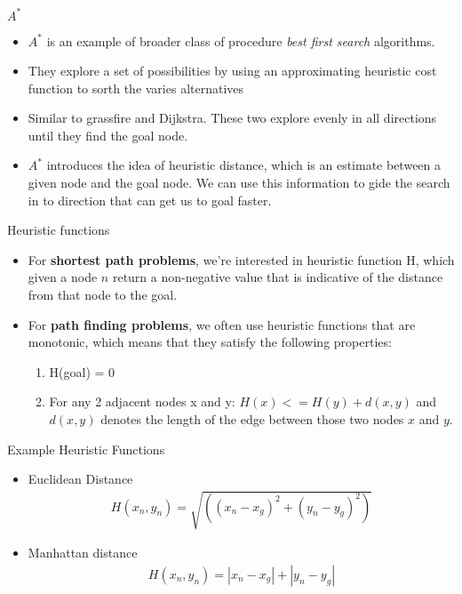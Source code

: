 \documentclass[10pt,mathserif]{beamer}
\begin{document}
\begin{frame}{$A^*$}
\begin{itemize}
\item $A^*$ is an example of broader class of procedure \textit{best first search} algorithms.
\item They explore a set of possibilities by using an approximating heuristic cost function to sorth the varies alternatives
\item Similar to grassfire and Dijkstra. These two explore evenly in all directions until they find the goal node.
\item $A^*$ introduces the idea of heuristic distance, which is an estimate between a given node and the goal node. We can use this information to gide the search in to direction that can get us to goal faster.
\end{itemize}
\end{frame}

\begin{frame}{Heuristic functions}
\begin{itemize}
\item For \textbf{shortest path problems}, we're interested in heuristic function H, which given a 
node $n$ return a non-negative value that is indicative of the distance from that node to the goal.
\item For \textbf{path finding problems}, we often use heuristic functions that are monotonic, which means that they satisfy the following properties:
\begin{enumerate}
\item H(goal) = 0
\item For any 2 adjacent nodes x and y: $H(x) <= H(y) + d(x,y)$ and $d(x,y)$ denotes the length of the edge between those two nodes $x$ and $y$.
\end{enumerate}
\end{itemize}
\end{frame}

\begin{frame}{Example Heuristic Functions}
\begin{itemize}
\item Euclidean Distance
\begin{align}
H(x_n,y_n) = \sqrt{((x_n - x_g)^2 + (y_n - y_g)^2)}
\end{align}
\item Manhattan distance
\begin{align}
H(x_n,y_n) = |x_n -x_g| + |y_n - y_g|
\end{align}
\end{itemize}
\end{frame}
\end{document}
